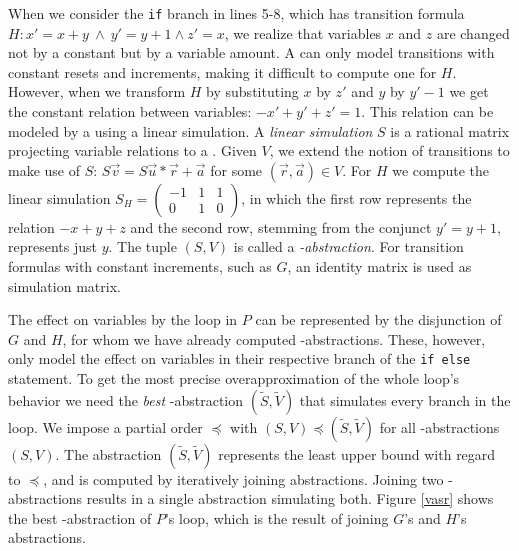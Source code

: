 When we consider the \texttt{if} branch in lines 5-8, which has transition formula $H: x' = x + y\ \land\ y' = y + 1 \land z' = x$, we realize that variables $x$ and $z$ are changed not by a constant but by a variable amount. A \qvasr can only model transitions with constant resets and increments, making it difficult to compute one for $H$. However, when we transform $H$ by substituting $x$ by $z'$ and $y$ by $y'- 1$ we get the constant relation between variables: $-x' + y' + z' = 1$. This relation can be modeled by a \qvasr using a linear simulation. A \textsl{linear simulation} $S$ is a rational matrix projecting variable relations to a \qvasr. Given \qvasr $V$, we extend the notion of transitions to make use of $S$: $S\vec{v} = S\vec{u} * \vec{r} + \vec{a}$ for some $(\vec{r}, \vec{a}) \in V$. For $H$ we compute the linear simulation $S_H = \begin{pmatrix}
	-1 & 1 & 1 \\
	0 & 1 & 0
\end{pmatrix}$, in which the first row represents the relation $-x + y + z$ and the second row, stemming from the conjunct $y' = y + 1$, represents just $y$. The tuple $(S, V)$ is called a \textsl{\qvasr-abstraction}. For transition formulas with constant increments, such as $G$, an identity matrix is used as simulation matrix. \par
The effect on variables by the loop in $P$ can be represented by the disjunction of $G$ and $H$, for whom we have already computed \qvasr-abstractions. These, however, only model the effect on variables in their respective branch of the \texttt{if else} statement. To get the most precise overapproximation of the whole loop's behavior we need the \textsl{best} \qvasr-abstraction $(\tilde{S}, \tilde{V})$ that simulates every branch in the loop.
We impose a partial order $\preceq$ with $(S, V) \preceq (\tilde{S}, \tilde{V})$ for all \qvasr-abstractions $(S, V)$. The abstraction $(\tilde{S}, \tilde{V})$ represents the least upper bound with regard to $\preceq$, and is computed by iteratively joining abstractions. Joining two \qvasr-abstractions results in a single abstraction simulating both. Figure \ref{vasr} shows the best \qvasr-abstraction of $P$'s loop, which is the result of joining $G$'s and $H$'s abstractions. \\



